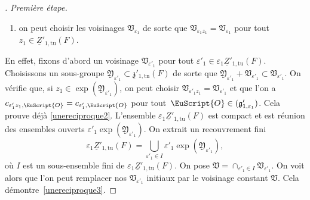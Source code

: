 \documentclass[JEP,XML,SOM,Unicode,francais]{cedram}
\let\mathcal \EuScript
\newcommand{\NoChangel}[1]{%
\expandafter\let\csname old\string#1\endcsname=#1
\let#1=\relax
\newcommand{#1}{\mathcode`l="716C\csname old\string#1\endcsname\mathcode`l="7160 }%
}
\let\epsilon\varepsilon
\newcommand{\frg}{\mathfrak{g}}
\newcommand{\frz}{\mathfrak{z}}
\newcommand{\frV}{\mathfrak{V}}
\newcommand{\frY}{\mathfrak{Y}}
\newcommand{\Nil}{\mathrm{Nil}} \NoChangel{\Nil}
\newcommand{\tn}{\mathrm{tn}}
\newcommand{\tu}{\mathrm{tu}}
\newcommand{\cO}{\mathcal{O}}
\theoremstyle{plain}
\theoremstyle{definition}
\begin{document}
\begin{proof}[\proofname. Première étape]
\begin{enumerate}
\item\label{unereciproque3}
on peut choisir les voisinages $\frV_{\epsilon_{1}}$ de sorte que $\frV_{\epsilon_{1}z_{1}}\!=\!\frV_{\epsilon_{1}}$ pour tout $z_{1}\!\in\!\underline{Z}'_{1,\tu}(F)$.
\end{enumerate}

En effet, fixons d'abord un voisinage $\frV_{\epsilon'_{1}}$ pour tout $\epsilon'_{1}\in \epsilon_{1}\underline{Z}'_{1,\tu}(F)$.
Choisissons un sous-groupe $\frY_{\epsilon'_{1}}\subset \underline{\frz}'_{1,\tn}(F)$ de sorte que $\frY_{\epsilon'_{1}}+\frV_{\epsilon'_{1}}\subset \frV_{\epsilon'_{1}}$. On vérifie que, si $z_{1}\in \exp(\frY_{\epsilon'_{1}}) $, on peut choisir $\frV_{\epsilon'_{1}z_{1}}=\frV_{\epsilon'_{1}}$ et que l'on a
$c_{\epsilon'_{1}z_{1},\cO}=c_{\epsilon'_{1},\cO}$ pour tout~$\cO\in \Nil(\frg'_{1,\epsilon_{1}})$. Cela prouve déjà \eqref{unereciproque2}. L'ensemble $\epsilon_{1}\underline{Z}'_{1,\tu}(F)$ est compact et est réunion des ensembles ouverts $\epsilon'_{1}\exp(\frY_{\epsilon'_{1}})$. On extrait un recouvrement fini
\[
\epsilon_{1}\underline{Z}'_{1,\tu}(F)=\bigcup_{\epsilon'_{1}\in I}\epsilon'_{1}\exp(\frY_{\epsilon'_{1}}),
\]
où $I$ est un sous-ensemble fini de $\epsilon_{1}\underline{Z}'_{1,\tu}(F)$. On pose $\frV=\cap_{\epsilon'_{1}\in I}\frV_{\epsilon'_{1}}$. On voit alors que l'on peut remplacer nos $\frV_{\epsilon'_{1}}$ initiaux par le voisinage constant $\frV$. Cela démontre~\eqref{unereciproque3}.


\end{proof}
\end{document}
